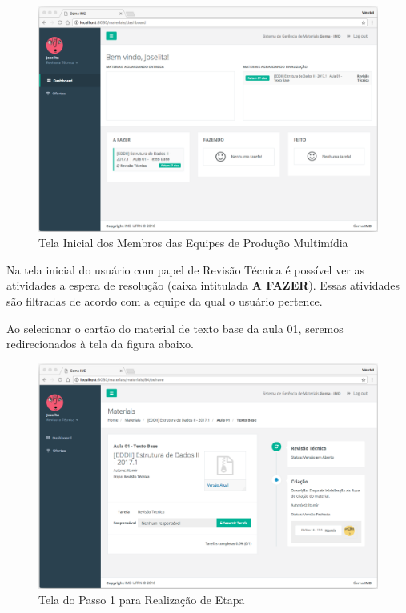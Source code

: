 \begin{figure}[H]
\centering
     \includegraphics[width=1.0\textwidth]{Screens/DashboardProduction.png}
      \caption{Tela Inicial dos Membros das Equipes de Produção Multimídia}
       \label{fig:DashboardProduction}
\end{figure}

Na tela inicial do usuário com papel de Revisão Técnica é possível ver as atividades a espera de resolução (caixa intitulada \textbf{A FAZER}). Essas atividades são filtradas de acordo com a equipe da qual o usuário pertence. 

Ao selecionar o cartão do material de texto base da aula 01, seremos redirecionados à tela da figura abaixo.

\begin{figure}[H]
\centering
     \includegraphics[width=1.0\textwidth]{Screens/BehaveMaterial.png}
      \caption{Tela do Passo 1 para Realização de Etapa}
       \label{fig:BehaveMaterial}
\end{figure}

